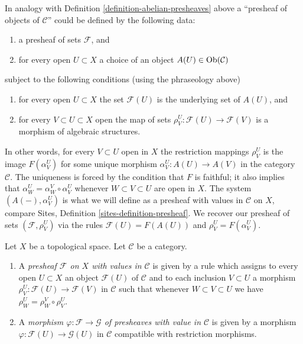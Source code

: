 \medskip\noindent
In analogy with Definition \ref{definition-abelian-presheaves}
above a ``presheaf of objects of $\mathcal{C}$'' could be
defined by the following data:
\begin{enumerate}
\item a presheaf of sets $\mathcal{F}$, and
\item for every open $U \subset X$ a choice
of an object $A(U) \in \mathop{\mathrm{Ob}}\nolimits(\mathcal{C})$
\end{enumerate}
subject to the following conditions (using the phraseology above)
\begin{enumerate}
\item for every open $U \subset X$ the set $\mathcal{F}(U)$
is the underlying set of $A(U)$, and
\item for every $V \subset U \subset X$ open
the map of sets $\rho_V^U: \mathcal{F}(U) \to \mathcal{F}(V)$
is a morphism of algebraic structures.
\end{enumerate}
In other words, for every $V \subset U$ open in $X$
the restriction mappings $\rho^U_V$ is the image
$F(\alpha^U_V)$ for some unique morphism
$\alpha^U_V : A(U) \to A(V)$ in the category $\mathcal{C}$.
The uniqueness is forced by the condition that $F$ is
faithful; it also implies that
$\alpha^U_W = \alpha^V_W \circ \alpha^U_V$
whenever $W \subset V \subset U$ are open in $X$.
The system $(A(-), \alpha^U_V)$ is what we will define as a
presheaf with values in $\mathcal{C}$ on $X$, compare
Sites, Definition \ref{sites-definition-presheaf}.
We recover our presheaf of sets $(\mathcal{F}, \rho_V^U)$
via the rules $\mathcal{F}(U) = F(A(U))$ and
$\rho_V^U = F(\alpha_V^U)$.

\begin{definition}
\label{definition-presheaf-values-in-category}
Let $X$ be a topological space.
Let $\mathcal{C}$ be a category.
\begin{enumerate}
\item A {\it presheaf $\mathcal{F}$ on $X$ with values in $\mathcal{C}$}
is given by a rule which assigns to every open $U \subset X$
an object $\mathcal{F}(U)$ of $\mathcal{C}$
and to each inclusion $V \subset U$
a morphism $\rho_V^U : \mathcal{F}(U) \to \mathcal{F}(V)$
in $\mathcal{C}$ such that whenever $W \subset V \subset U$
we have $\rho_W^U = \rho_W^V \circ \rho_V^U$.
\item A {\it morphism $\varphi : \mathcal{F} \to \mathcal{G}$
of presheaves with value in $\mathcal{C}$} is given by a
morphism $\varphi : \mathcal{F}(U) \to \mathcal{G}(U)$
in $\mathcal{C}$ compatible with restriction morphisms.
\end{enumerate}
\end{definition}

